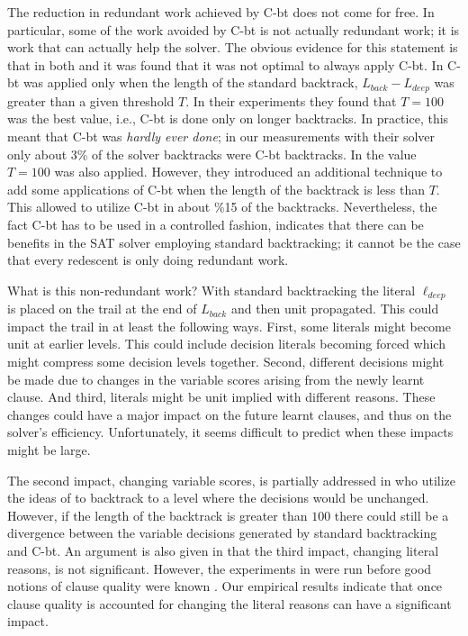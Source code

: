 \documentclass[runningheads]{llncs}
\newcommand{\sat}{SAT\xspace}
\newcommand{\deepestLvl}{L_{\textit{deep}}}
\newcommand{\deepestLit}{\ell_{\textit{deep}}}
\newcommand{\btL}{L_{\textit{back}}}
\newcommand{\cbt}{C-bt\xspace}
\begin{document}
The reduction in redundant work achieved by \cbt does not come for
free. In particular, some of the work avoided by \cbt is not actually
redundant work; it is work that can actually help the solver. The
obvious evidence for this statement is that in both
\cite{DBLP:conf/sat/NadelR18} and \cite{DBLP:conf/sat/MohleB19} it was
found that it was not optimal to always apply \cbt. In
\cite{DBLP:conf/sat/NadelR18} \cbt was applied only when the length of
the standard backtrack, $\btL-\deepestLvl$ was greater than a given
threshold $T$. In their experiments they found that $T=100$ was the
best value, i.e., \cbt is done only on longer backtracks. In practice,
this meant that \cbt was \emph{hardly ever done}; in our measurements
with their solver only about 3\% of the solver backtracks were \cbt
backtracks. In \cite{DBLP:conf/sat/MohleB19} the value $T=100$ was
also applied. However, they introduced an additional technique to add
some applications of \cbt when the length of the backtrack is less
than $T$. This allowed \cite{DBLP:conf/sat/MohleB19} to utilize \cbt
in about \%15 of the backtracks. Nevertheless, the fact \cbt has to be used
in a controlled fashion, indicates that there can be benefits in the \sat
solver employing standard backtracking; it cannot be the case that
every redescent is only doing redundant work.

What is this non-redundant work? With standard backtracking the
literal $\deepestLit$ is placed on the trail at the end of $\btL$ and
then unit propagated. This could impact the trail in at least the
following ways. First, some literals might become unit at earlier
levels. This could include decision literals becoming forced which
might compress some decision levels together. Second, different
decisions might be made due to changes in the variable scores arising
from the newly learnt clause. And third, literals might be unit
implied with different reasons. These changes could have a major
impact on the future learnt clauses, and thus on the solver's
efficiency. Unfortunately, it seems difficult to predict when these
impacts might be large.

The second impact, changing variable scores, is partially addressed in
\cite{DBLP:conf/sat/MohleB19} who utilize the ideas of
\cite{DBLP:journals/jsat/TakRH11} to backtrack to a level where the
decisions would be unchanged. However, if the length of the backtrack
is greater than $100$ there could still be a divergence between the
variable decisions generated by standard backtracking and \cbt. An
argument is also given in \cite{DBLP:journals/jsat/TakRH11} that the
third impact, changing literal reasons, is not significant. However,
the experiments in \cite{DBLP:journals/jsat/TakRH11} were run before
good notions of clause quality were known
\cite{DBLP:conf/ijcai/AudemardS09}. Our empirical results indicate
that once clause quality is accounted for changing the literal reasons
can have a significant impact.
\end{document}
